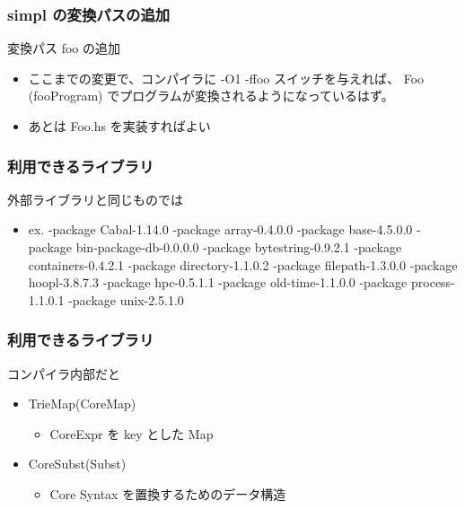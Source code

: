 \documentclass[cjk,dvipdfm,14pt]{beamer}
\begin{document}
\begin{frame}[fragile]
\frametitle{simpl の変換パスの追加}

変換パス foo の追加

\hrulefill

\begin{itemize}
\item ここまでの変更で、コンパイラに -O1 -ffoo スイッチを与えれば、
Foo (fooProgram) でプログラムが変換されるようになっているはず。
\item あとは Foo.hs を実装すればよい
\end{itemize}

\end{frame}


\begin{frame}[fragile]
\frametitle{利用できるライブラリ}

外部ライブラリと同じものでは

\begin{itemize}
\item ex. -package Cabal-1.14.0 -package array-0.4.0.0 -package base-4.5.0.0
-package bin-package-db-0.0.0.0 -package bytestring-0.9.2.1
-package containers-0.4.2.1 -package directory-1.1.0.2 -package filepath-1.3.0.0
-package hoopl-3.8.7.3 -package hpc-0.5.1.1 -package old-time-1.1.0.0
-package process-1.1.0.1 -package unix-2.5.1.0
\end{itemize}

\end{frame}


\begin{frame}[fragile]
\frametitle{利用できるライブラリ}

コンパイラ内部だと
\begin{itemize}
\item TrieMap(CoreMap)
 \begin{itemize}
 \item CoreExpr を key とした Map
 \end{itemize}
\item CoreSubst(Subst)
 \begin{itemize}
 \item Core Syntax を置換するためのデータ構造
 \end{itemize}
\end{itemize}
\end{frame}

\begin{frame}[fragile]
\frametitle{}
\end{frame}
\end{document}
